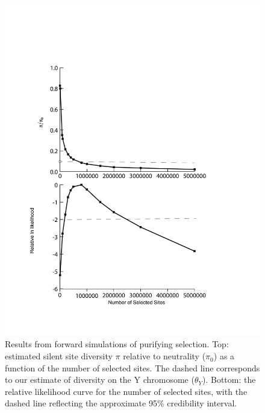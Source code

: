 \documentclass[9pt,twocolumn,twoside]{gsajnl}
\begin{document}
\begin{figure}[t!]
\centering
\noindent
\includegraphics[width=\linewidth]{figure3.jpg}
\caption{Results from forward simulations of purifying selection. Top: estimated silent site diversity $\pi$ relative to neutrality ($\pi_{0}$) as a function of the number of selected sites. The dashed line corresponds to our estimate of diversity on the Y chromosome ($\theta_{Y}$). Bottom: the relative likelihood curve for the number of selected sites, with the dashed line reflecting the approximate 95\% credibility interval.
}
\label{fig:selectedsites}
\end{figure}
\end{document}
